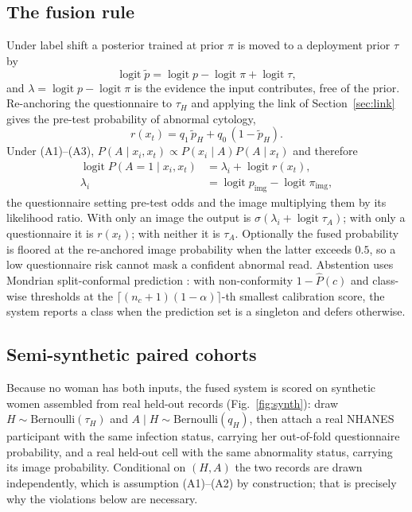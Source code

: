 \documentclass[lettersize,journal]{IEEEtran}
\newcommand{\logit}{\operatorname{logit}}
\newcommand{\pimg}{p_{\mathrm{img}}}
\newcommand{\piimg}{\pi_{\mathrm{img}}}
\begin{document}
\subsection{The fusion rule}
\label{sec:coprior}
Under label shift a posterior trained at prior $\pi$ is moved to a deployment prior $\tau$ by \cite{saerens2002adjusting}
\begin{equation}
\logit \tilde p = \logit p - \logit \pi + \logit \tau ,
\label{eq:anchor}
\end{equation}
and $\lambda=\logit p-\logit\pi$ is the evidence the input contributes, free of the prior. Re-anchoring the questionnaire to $\tau_H$ and applying the link of Section~\ref{sec:link} gives the pre-test probability of abnormal cytology,
\begin{equation}
r(x_t) = q_1\,\tilde p_H + q_0\,(1-\tilde p_H).
\label{eq:bridge}
\end{equation}
Under (A1)--(A3), $P(A\mid x_i,x_t)\propto P(x_i\mid A)P(A\mid x_t)$ and therefore
\begin{equation}
\begin{split}
\logit P(A{=}1\mid x_i,x_t) &= \lambda_i + \logit r(x_t),\\
\lambda_i &= \logit\pimg - \logit\piimg,
\end{split}
\label{eq:fuse}
\end{equation}
the questionnaire setting pre-test odds and the image multiplying them by its likelihood ratio. With only an image the output is $\sigma(\lambda_i+\logit\tau_A)$; with only a questionnaire it is $r(x_t)$; with neither it is $\tau_A$. Optionally the fused probability is floored at the re-anchored image probability when the latter exceeds $0.5$, so a low questionnaire risk cannot mask a confident abnormal read. Abstention uses Mondrian split-conformal prediction \cite{vovk2005algorithmic,angelopoulos2023conformal}: with non-conformity $1-\hat P(c)$ and class-wise thresholds at the $\lceil(n_c+1)(1-\alpha)\rceil$-th smallest calibration score, the system reports a class when the prediction set is a singleton and defers otherwise.

\subsection{Semi-synthetic paired cohorts}
\label{sec:synthetic}
Because no woman has both inputs, the fused system is scored on synthetic women assembled from real held-out records (Fig.~\ref{fig:synth}): draw $H\sim\mathrm{Bernoulli}(\tau_H)$ and $A\mid H\sim\mathrm{Bernoulli}(q_H)$, then attach a real NHANES participant with the same infection status, carrying her out-of-fold questionnaire probability, and a real held-out cell with the same abnormality status, carrying its image probability. Conditional on $(H,A)$ the two records are drawn independently, which is assumption (A1)--(A2) by construction; that is precisely why the violations below are necessary.
\end{document}
